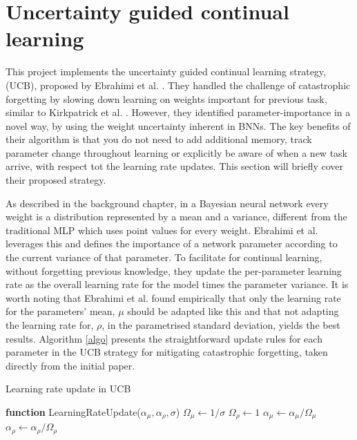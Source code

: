\documentclass[a4paper,12pt]{report}
\begin{document}
\section{Uncertainty guided continual learning}
This project implements the uncertainty guided continual learning strategy, (UCB),  proposed by Ebrahimi et al. \cite{ebrahimi2019uncertainty}. They handled the challenge of catastrophic forgetting by slowing down learning on weights important for previous task, similar to Kirkpatrick et al. \cite{kirkpatrick2017overcoming}. However, they identified parameter-importance in a novel way, by using the weight uncertainty inherent in BNNs. The key benefits of their algorithm is that you do not need to add additional memory, track parameter change throughout learning or explicitly be aware of when a new task arrive, with respect tot the learning rate updates. This section will briefly cover their proposed strategy.

As described in the background chapter, in a Bayesian neural network every weight is a distribution represented by a mean and a variance, different from the traditional MLP which uses point values for every weight. Ebrahimi et al. leverages this and defines the importance of a network parameter according to the current variance of that parameter. To facilitate for continual learning, without forgetting previous knowledge, they update the per-parameter learning rate as the overall learning rate for the model times the parameter variance. It is worth noting that Ebrahimi et al. found empirically that only the learning rate for the  parameters' mean, $\mu$ should be adapted like this and that not adapting the learning rate for, $\rho$, in the parametrised standard deviation, yields the best results. Algorithm \ref{algo} presents the straightforward update rules for each parameter in the UCB strategy for mitigating catastrophic forgetting, taken directly from the initial paper.

\begin{algorithm}
\caption{Learning rate update in UCB }\label{algo}
\begin{algorithmic}[1]
\State \textbf{function} LearningRateUpdate($\alpha_{\mu}, \alpha_{\rho}, \sigma$)
    \State $\Omega_{\mu} \leftarrow 1/\sigma$
    \State $\Omega_{\rho} \leftarrow 1$
    \State $\alpha_{\mu} \leftarrow \alpha_{\mu}/\Omega_{\mu}$
    \State $\alpha_{\rho} \leftarrow \alpha_{\rho}/\Omega_{\rho}$
\EndFor
\end{algorithmic}
\end{algorithm}
\end{document}
